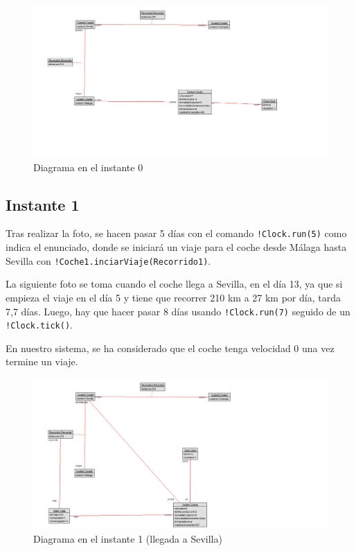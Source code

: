 \documentclass[12pt.a4paper]{article}
\begin{document}
\begin{figure}[H]
    \centering
    \includegraphics[width=\linewidth]{fotosInstantes/Instante0.png}
    \caption{Diagrama en el instante 0}
\end{figure}

\subsection{Instante 1}
Tras realizar la foto, se hacen pasar 5 días con el comando \texttt{!Clock.run(5)} como indica el enunciado, donde se iniciará un viaje para el coche desde Málaga hasta Sevilla con \texttt{!Coche1.inciarViaje(Recorrido1)}.

La siguiente foto se toma cuando el coche llega a Sevilla, en el día 13, ya que si empieza el viaje en el día 5 y tiene que recorrer 210 km a 27 km por día, tarda 7,7 días. Luego, hay que hacer pasar 8 días usando \texttt{!Clock.run(7)} seguido de un \texttt{!Clock.tick()}.

En nuestro sistema, se ha considerado que el coche tenga velocidad 0 una vez termine un viaje.

\begin{figure}[H]
    \centering
    \includegraphics[width=\linewidth]{fotosInstantes/Instante1.png}
    \caption{Diagrama en el instante 1 (llegada a Sevilla)}
\end{figure}
\end{document}
